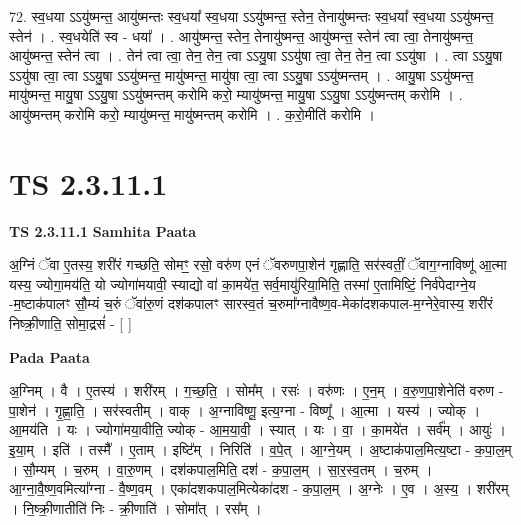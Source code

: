 \documentclass[17pt]{extarticle}
\begin{document}
72. स्व॒धया ऽऽयु॑ष्मन्त॒ आयु॑ष्मन्तः स्व॒धया᳚ स्व॒धया ऽऽयु॑ष्मन्त॒ स्तेन॒ तेनायु॑ष्मन्तः स्व॒धया᳚ स्व॒धया ऽऽयु॑ष्मन्त॒ स्तेन॑ । . स्व॒धयेति॑ स्व - धया᳚ । . आयु॑ष्मन्त॒ स्तेन॒ तेनायु॑ष्मन्त॒ आयु॑ष्मन्त॒ स्तेन॑ त्वा त्वा॒ तेनायु॑ष्मन्त॒ आयु॑ष्मन्त॒ स्तेन॑ त्वा । . तेन॑ त्वा त्वा॒ तेन॒ तेन॒ त्वा ऽऽयु॒षा ऽऽयु॑षा त्वा॒ तेन॒ तेन॒ त्वा ऽऽयु॑षा । . त्वा ऽऽयु॒षा ऽऽयु॑षा त्वा॒ त्वा ऽऽयु॒षा ऽऽयु॑ष्मन्त॒ मायु॑ष्मन्त॒ मायु॑षा त्वा॒ त्वा ऽऽयु॒षा ऽऽयु॑ष्मन्तम् । . आयु॒षा ऽऽयु॑ष्मन्त॒ मायु॑ष्मन्त॒ मायु॒षा ऽऽयु॒षा ऽऽयु॑ष्मन्तम् करोमि करो॒ म्यायु॑ष्मन्त॒ मायु॒षा ऽऽयु॒षा ऽऽयु॑ष्मन्तम् करोमि । . आयु॑ष्मन्तम् करोमि करो॒ म्यायु॑ष्मन्त॒ मायु॑ष्मन्तम् करोमि । . क॒रो॒मीति॑ करोमि । \newline
\pagebreak
{}
\section*{ TS 2.3.11.1 }

\textbf{TS 2.3.11.1 } \newline
\textbf{Samhita Paata} \newline

अ॒ग्निं ॅवा ए॒तस्य॒ शरी॑रं गच्छति॒ सोमꣳ॒॒ रसो॒ वरु॑ण एनं ॅवरुणपा॒शेन॑ गृह्णाति॒ सर॑स्वतीं॒ ॅवाग॒ग्नाविष्णू॑ आ॒त्मा यस्य॒ ज्योगा॒मय॑ति॒ यो ज्योगा॑मयावी॒ स्याद्यो वा॑ का॒मये॑त॒ सर्व॒मायु॑रिया॒मिति॒ तस्मा॑ ए॒तामिष्टिं॒ निर्व॑पेदाग्ने॒य -म॒ष्टाक॑पालꣳ सौ॒म्यं च॒रुं ॅवा॑रु॒णं दश॑कपालꣳ सारस्व॒तं च॒रुमा᳚ग्नावैष्ण॒व-मेका॑दशकपाल-म॒ग्नेरे॒वास्य॒ शरी॑रं निष्क्री॒णाति॒ सोमा॒द्रसं॑ - [  ] \newline

\textbf{Pada Paata} \newline

अ॒ग्निम् । वै । ए॒तस्य॑ । शरी॑रम् । ग॒च्छ॒ति॒ । सोम᳚म् । रसः॑ । वरु॑णः । ए॒न॒म् । व॒रु॒ण॒पा॒शेनेति॑ वरुण - पा॒शेन॑ । गृ॒ह्णा॒ति॒ । सर॑स्वतीम् । वाक् । अ॒ग्नाविष्णू॒ इत्य॒ग्ना - विष्णू᳚ । आ॒त्मा । यस्य॑ । ज्योक् । आ॒मय॑ति । यः । ज्योगा॑मया॒वीति॒ ज्योक् - आ॒म॒या॒वी॒ । स्यात् । यः । वा॒ । का॒मये॑त । सर्व᳚म् । आयुः॑ । इ॒या॒म् । इति॑ । तस्मै᳚ । ए॒ताम् । इष्टि᳚म् । निरिति॑ । व॒पे॒त् । आ॒ग्ने॒यम् । अ॒ष्टाक॑पाल॒मित्य॒ष्टा - क॒पा॒ल॒म् । सौ॒म्यम् । च॒रुम् । वा॒रु॒णम् । दश॑कपाल॒मिति॒ दश॑ - क॒पा॒ल॒म् । सा॒र॒स्व॒तम् । च॒रुम् । आ॒ग्ना॒वै॒ष्ण॒वमित्या᳚ग्ना - वै॒ष्ण॒वम् । एका॑दशकपाल॒मित्येका॑दश - क॒पा॒ल॒म् । अ॒ग्नेः । ए॒व । अ॒स्य॒ । शरी॑रम् । नि॒ष्क्री॒णातीति॑ निः - क्री॒णाति॑ । सोमा᳚त् । रस᳚म् ।  \newline
\end{document}

